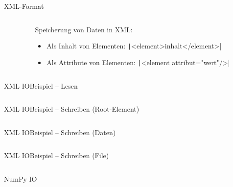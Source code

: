 \documentclass[xelatex,aspectratio=169]{beamer}
\begin{document}
\begin{frame}{XML-Format}
    \begin{columns}
        \begin{column}{0.5\textwidth}
            \inputminted{xml}{src/waren_short.xml}
        \end{column}
        \begin{column}{0.5\textwidth}
            Speicherung von Daten in XML:
            \begin{itemize}
                \item Als Inhalt von Elementen: \texttt|<element>inhalt</element>|
                \item Als Attribute von Elementen: \texttt|<element attribut="wert"/>|
            \end{itemize}
        \end{column}
    \end{columns}
\end{frame}

\begin{frame}{XML IO}{Beispiel -- Lesen}
    \small
    \inputminted[firstline=1,lastline=17]{python}{src/io_xml.py}
\end{frame}

\begin{frame}{XML IO}{Beispiel -- Schreiben (Root-Element)}
    \small
    \inputminted[firstline=19,lastline=21]{python}{src/io_xml.py}
\end{frame}

\begin{frame}{XML IO}{Beispiel -- Schreiben (Daten)}
    \smaller
    \inputminted[firstline=23,lastline=40]{python}{src/io_xml.py}
\end{frame}

\begin{frame}{XML IO}{Beispiel -- Schreiben (File)}
    \small
    \inputminted[firstline=42,lastline=45]{python}{src/io_xml.py}
\end{frame}

\begin{frame}{NumPy IO}
    \small
    \inputminted[firstline=1,lastline=14]{python}{src/io_numpy.py}
\end{frame}
\end{document}
